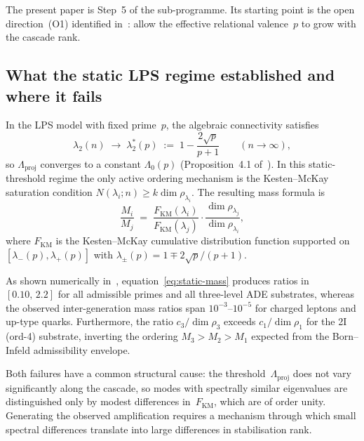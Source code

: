 \documentclass[11pt,a4paper]{article}
\newcommand{\Lproj}{\Lambda_{\mathrm{proj}}}
\newcommand{\lpm}{\lambda_{\pm}}
\newcommand{\ltwo}{\lambda_{2}}
\newcommand{\FKM}{F_{\mathrm{KM}}}
\newcommand{\Mi}{M_i}
\newcommand{\Mj}{M_j}
\begin{document}
      The present paper is Step~5 of the sub-programme.
      Its starting point is the open direction~(O1) identified in~\cite{Beau2026a5}:
      allow the effective relational valence~$p$ to grow with the cascade rank.

    \subsection{What the static LPS regime established and where it fails}
      \label{subsec:static-failure}

      In the LPS model with fixed prime~$p$, the algebraic connectivity satisfies
      \begin{equation}
        \ltwo(n) \;\longrightarrow\; \lambda_{2}^{*}(p)
        \;:=\; 1 - \frac{2\sqrt{p}}{p+1}
        \qquad (n\to\infty),
      \end{equation}
      so $\Lproj$ converges to a constant $\Lambda_{0}(p)$
      (Proposition~4.1 of~\cite{Beau2026a5}).
      In this static-threshold regime the only active ordering mechanism is the
      Kesten--McKay saturation condition $N(\lambda_{i};n)\geq k\dim\rho_{\lambda_i}$.
      The resulting mass formula is
      \begin{equation}
        \label{eq:static-mass}
        \frac{\Mi}{\Mj}
        \;=\;
        \frac{\FKM(\lambda_{i})}{\FKM(\lambda_{j})}
        \cdot
        \frac{\dim\rho_{\lambda_{j}}}{\dim\rho_{\lambda_{i}}},
      \end{equation}
      where $\FKM$ is the Kesten--McKay cumulative distribution function supported on
      $[\lambda_{-}(p),\lambda_{+}(p)]$ with $\lpm(p)= 1\mp 2\sqrt{p}/(p+1)$.

      As shown numerically in~\cite{Beau2026a5},
      equation~\eqref{eq:static-mass} produces ratios in~$[0.10,\,2.2]$
      for all admissible primes and all three-level ADE substrates,
      whereas the observed inter-generation mass ratios span
      $10^{-3}$--$10^{-5}$ for charged leptons and up-type quarks.
      Furthermore, the ratio $c_{3}/\dim\rho_{3}$ exceeds $c_{1}/\dim\rho_{1}$
      for the 2I (ord-4) substrate, inverting the ordering
      $M_{3}>M_{2}>M_{1}$ expected from the Born--Infeld admissibility envelope.

      Both failures have a common structural cause: the threshold~$\Lproj$ does not vary
      significantly along the cascade, so modes with spectrally similar eigenvalues are
      distinguished only by modest differences in~$\FKM$, which are of order unity.
      Generating the observed amplification requires a mechanism through which small
      spectral differences translate into large differences in stabilisation rank.
\end{document}
